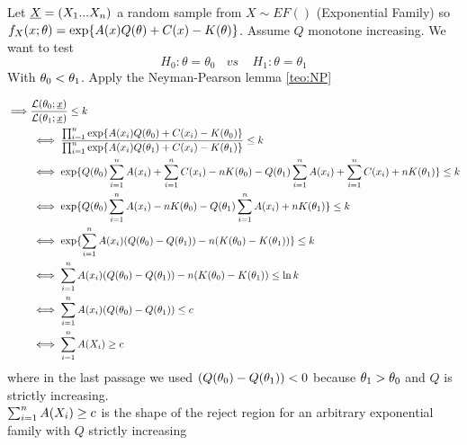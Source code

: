 \begin{eg}\label{eg:exponentialf}
		Let $\underline X=(X_1 ... X_n)$ a random sample from $X\sim EF()$ (Exponential Family) so $f_X(x;\theta)=\exp \{ A(x) Q(\theta)+ C(x)- K(\theta) \}$. Assume $Q$ monotone increasing. We want to test 
			$$H_0: \theta= \theta_0 \ \ \ \ vs\ \ \ \ \ H_1: \theta= \theta_1 $$
			With $\theta_0< \theta_1$. Apply the Neyman-Pearson lemma \ref{teo:NP}
			
			\[
			\begin{split}
			\implies & \frac{\mathcal{L}(\theta_0;\underline x)}{\mathcal{L}(\theta_1;\underline x)}\leq k\\
			&\iff \frac{\prod_{i=1}^{n} \exp \{ A(x_i) Q(\theta_0)+ C(x_i)- K(\theta_0) \} }{\prod_{i=1}^{n} \exp \{ A(x_i) Q(\theta_1)+ C(x_i)- K(\theta_1) \}}\leq k\\
			&\iff  \exp \{  Q(\theta_0) \sum_{i=1}^n A(x_i)+ \sum_{i=1}^n C(x_i)- nK(\theta_0) - Q(\theta_1)  \sum_{i=1}^n A(x_i)+\sum_{i=1}^n C(x_i)+nK(\theta_1) \}\leq k\\
			&\iff  \exp \{  Q(\theta_0) \sum_{i=1}^n A(x_i) - nK(\theta_0) - Q(\theta_1)  \sum_{i=1}^n A(x_i)+nK(\theta_1) \}\leq k\\
			&\iff  \exp \{   \sum_{i=1}^n A(x_i)(Q(\theta_0) -  Q(\theta_1)) - n(K(\theta_0) - K(\theta_1)) \}\leq k\\
			&\iff    \sum_{i=1}^n A(x_i)(Q(\theta_0) -  Q(\theta_1)) - n(K(\theta_0) - K(\theta_1)) \leq \ln k\\
			&\iff    \sum_{i=1}^n A(x_i)(Q(\theta_0) -  Q(\theta_1))  \leq c\\
			&\iff \sum_{i=1}^n A(X_i) \geq c
			\end{split}
			\]
			where in the last passage we used $	(Q(\theta_0) -  Q(\theta_1))< 0$ because $\theta_1 > \theta_0$ and $Q$ is strictly increasing.\\
			$\sum_{i=1}^n A(X_i) \geq c$ is the shape of the reject region for an arbitrary exponential family with $Q$ strictly increasing
\end{eg}

